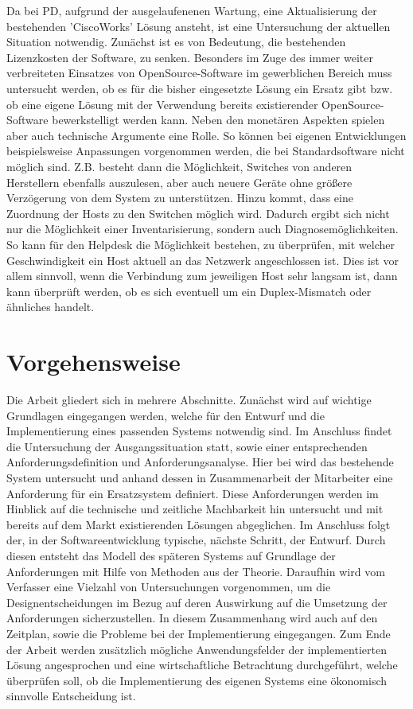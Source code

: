 Da bei PD, aufgrund der ausgelaufenenen Wartung, eine Aktualisierung der bestehenden 'CiscoWorks' Lösung ansteht, ist eine Untersuchung der aktuellen Situation notwendig.
Zunächst ist es von Bedeutung, die bestehenden Lizenzkosten der Software, zu senken.
Besonders im Zuge des immer weiter verbreiteten Einsatzes von OpenSource-Software im gewerblichen Bereich muss untersucht werden, ob es für die bisher eingesetzte Lösung ein Ersatz gibt bzw. ob eine eigene Lösung mit der Verwendung bereits existierender OpenSource-Software bewerkstelligt werden kann.
Neben den monetären Aspekten spielen aber auch technische Argumente eine Rolle.
So können bei eigenen Entwicklungen beispielsweise Anpassungen vorgenommen werden, die bei Standardsoftware nicht möglich sind.
Z.B. besteht dann die Möglichkeit, Switches von anderen Herstellern ebenfalls auszulesen, aber auch neuere Geräte ohne größere Verzögerung von dem System zu unterstützen.
Hinzu kommt, dass eine Zuordnung der Hosts zu den Switchen möglich wird.
Dadurch ergibt sich nicht nur die Möglichkeit einer Inventarisierung, sondern auch Diagnosemöglichkeiten. So kann für den Helpdesk die Möglichkeit bestehen, zu überprüfen, mit welcher Geschwindigkeit ein Host aktuell an das Netzwerk angeschlossen ist.
Dies ist vor allem sinnvoll, wenn die Verbindung zum jeweiligen Host sehr langsam ist, dann kann überprüft werden, ob es sich eventuell um ein Duplex-Mismatch oder ähnliches handelt.


\section{Vorgehensweise}

Die Arbeit gliedert sich in mehrere Abschnitte.
Zunächst wird auf wichtige Grundlagen eingegangen werden, welche für den Entwurf und die Implementierung eines passenden Systems notwendig sind.
Im Anschluss findet die Untersuchung der Ausgangssituation statt, sowie einer entsprechenden Anforderungsdefinition und Anforderungsanalyse.
Hier bei wird das bestehende System untersucht und anhand dessen in Zusammenarbeit der Mitarbeiter eine Anforderung für ein Ersatzsystem definiert.
Diese Anforderungen werden im Hinblick auf die technische und zeitliche Machbarkeit hin untersucht und mit bereits auf dem Markt existierenden Lösungen abgeglichen.
Im Anschluss folgt der, in der Softwareentwicklung typische, nächste Schritt, der Entwurf.
Durch diesen entsteht das Modell des späteren Systems auf Grundlage der Anforderungen mit Hilfe von Methoden aus der Theorie.
Daraufhin wird vom Verfasser eine Vielzahl von Untersuchungen vorgenommen, um die Designentscheidungen im Bezug auf deren Auswirkung auf die Umsetzung der Anforderungen sicherzustellen.
In diesem Zusammenhang wird auch auf den Zeitplan, sowie die Probleme bei der Implementierung eingegangen.
Zum Ende der Arbeit werden zusätzlich mögliche Anwendungsfelder der implementierten Lösung angesprochen und eine wirtschaftliche Betrachtung durchgeführt, welche überprüfen soll, ob die Implementierung des eigenen Systems eine ökonomisch sinnvolle Entscheidung ist.\\
